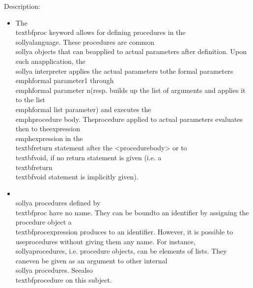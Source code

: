 \noindent Description: \begin{itemize}

\item The \\textbf{proc} keyword allows for defining procedures in the \\sollya\n   language. These procedures are common \\sollya objects that can be\n   applied to actual parameters after definition. Upon such an\n   application, the \\sollya interpreter applies the actual parameters to\n   the formal parameters \\emph{formal parameter1} through \\emph{formal parameter n}\n   (resp. builds up the list of arguments and applies it to the list\n   \\emph{formal list parameter}) and executes the \\emph{procedure body}. The\n   procedure applied to actual parameters evaluates then to the\n   expression \\emph{expression} in the \\textbf{return} statement after the <procedure\n   body> or to \\textbf{void}, if no return statement is given (i.e. a \\textbf{return}\n   \\textbf{void} statement is implicitly given).\n
\item \\sollya procedures defined by \\textbf{proc} have no name. They can be bound\n   to an identifier by assigning the procedure object a \\textbf{proc}\n   expression produces to an identifier. However, it is possible to use\n   procedures without giving them any name. For instance, \\sollya\n   procedures, i.e. procedure objects, can be elements of lists. They can\n   even be given as an argument to other internal \\sollya procedures. See\n   also \\textbf{procedure} on this subject.\n

\end{itemize}
